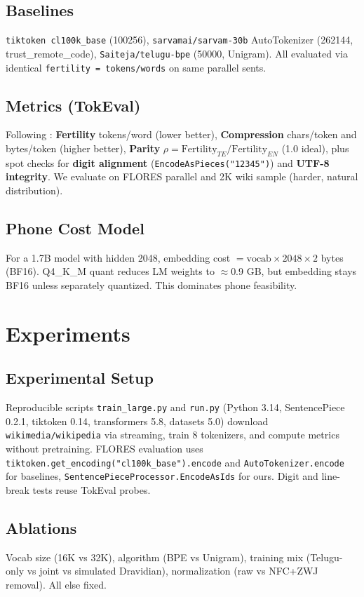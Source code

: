 \documentclass[conference]{IEEEtran}
\begin{document}
\subsection{Baselines}
\texttt{tiktoken cl100k\_base} (100256), \texttt{sarvamai/sarvam-30b} AutoTokenizer (262144, trust\_remote\_code), \texttt{Saiteja/telugu-bpe} (50000, Unigram). All evaluated via identical \texttt{fertility = tokens/words} on same parallel sents.

\subsection{Metrics (TokEval)}
Following \cite{meister2026tokeval}: \textbf{Fertility} tokens/word (lower better), \textbf{Compression} chars/token and bytes/token (higher better), \textbf{Parity} $\rho = \text{Fertility}_{TE}/\text{Fertility}_{EN}$ (1.0 ideal), plus spot checks for \textbf{digit alignment} (\texttt{EncodeAsPieces("12345")}) and \textbf{UTF-8 integrity}. We evaluate on FLORES parallel and 2K wiki sample (harder, natural distribution).

\subsection{Phone Cost Model}
For a 1.7B model with hidden 2048, embedding cost $= \text{vocab} \times 2048 \times 2$ bytes (BF16). Q4\_K\_M quant reduces LM weights to $\approx$0.9 GB, but embedding stays BF16 unless separately quantized. This dominates phone feasibility.

\section{Experiments}

\subsection{Experimental Setup}
Reproducible scripts \texttt{train\_large.py} and \texttt{run.py} (Python 3.14, SentencePiece 0.2.1, tiktoken 0.14, transformers 5.8, datasets 5.0) download \texttt{wikimedia/wikipedia} via streaming, train 8 tokenizers, and compute metrics without pretraining. FLORES evaluation uses \texttt{tiktoken.get\_encoding("cl100k\_base").encode} and \texttt{AutoTokenizer.encode} for baselines, \texttt{SentencePieceProcessor.EncodeAsIds} for ours. Digit and line-break tests reuse TokEval probes.

\subsection{Ablations}
Vocab size (16K vs 32K), algorithm (BPE vs Unigram), training mix (Telugu-only vs joint vs simulated Dravidian), normalization (raw vs NFC+ZWJ removal). All else fixed.
\end{document}

